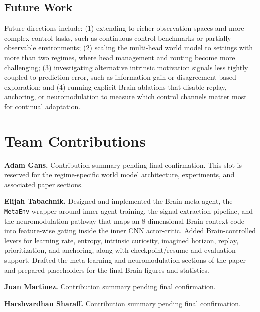 ﻿\documentclass[sigconf]{acmart}
\begin{document}
\subsection{Future Work}
Future directions include: (1) extending to richer observation spaces and more complex control tasks, such as continuous-control benchmarks or partially observable environments; (2) scaling the multi-head world model to settings with more than two regimes, where head management and routing become more challenging; (3) investigating alternative intrinsic motivation signals less tightly coupled to prediction error, such as information gain or disagreement-based exploration; and (4) running explicit Brain ablations that disable replay, anchoring, or neuromodulation to measure which control channels matter most for continual adaptation.




\clearpage
\section*{Team Contributions}
\label{sec:contributions}
\noindent\textbf{Adam Gans.}
Contribution summary pending final confirmation. This slot is reserved for the regime-specific world model architecture, experiments, and associated paper sections.

\vspace{0.5em}
\noindent\textbf{Elijah Tabachnik.}
Designed and implemented the Brain meta-agent, the \texttt{MetaEnv} wrapper around inner-agent training, the signal-extraction pipeline, and the neuromodulation pathway that maps an 8-dimensional Brain context code into feature-wise gating inside the inner CNN actor-critic. Added Brain-controlled levers for learning rate, entropy, intrinsic curiosity, imagined horizon, replay, prioritization, and anchoring, along with checkpoint/resume and evaluation support. Drafted the meta-learning and neuromodulation sections of the paper and prepared placeholders for the final Brain figures and statistics.

\vspace{0.5em}
\noindent\textbf{Juan Martinez.}
Contribution summary pending final confirmation.

\vspace{0.5em}
\noindent\textbf{Harshvardhan Sharaff.}
Contribution summary pending final confirmation.
\end{document}
